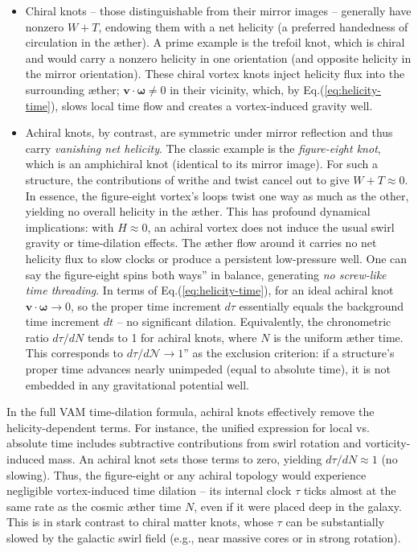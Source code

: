 \begin{itemize}
\item Chiral knots -- those distinguishable from their mirror images -- generally have nonzero $W+T$, endowing them with a net helicity (a preferred handedness of circulation in the \ae ther). A prime example is the trefoil knot, which is chiral and would carry a nonzero helicity in one orientation (and opposite helicity in the mirror orientation). These chiral vortex knots inject helicity flux into the surrounding \ae ther; $\mathbf{v}\cdot\boldsymbol{\omega}\neq 0$ in their vicinity, which, by Eq.(\ref{eq:helicity-time}), slows local time flow and creates a vortex-induced gravity well.

\item Achiral knots, by contrast, are symmetric under mirror reflection and thus carry \textit{vanishing net helicity}. The classic example is the \textit{figure-eight knot}, which is an amphichiral knot (identical to its mirror image). For such a structure, the contributions of writhe and twist cancel out to give $W+T \approx 0$. In essence, the figure-eight vortex's loops twist one way as much as the other, yielding no overall helicity in the \ae ther. This has profound dynamical implications: with $H \approx 0$, an achiral vortex does not induce the usual swirl gravity or time-dilation effects. The \ae ther flow around it carries no net helicity flux to slow clocks or produce a persistent low-pressure well. One can say the figure-eight spins both ways'' in balance, generating \textit{no screw-like time threading}. In terms of Eq.(\ref{eq:helicity-time}), for an ideal achiral knot $\mathbf{v}\cdot\boldsymbol{\omega}\to 0$, so the proper time increment $d\tau$ essentially equals the background time increment $dt$ -- no significant dilation. Equivalently, the chronometric ratio $d\tau/dN$ tends to 1 for achiral knots, where $N$ is the uniform \ae ther time. This corresponds to $d\tau/d\mathcal{N} \to 1$'' as the exclusion criterion: if a structure's proper time advances nearly unimpeded (equal to absolute time), it is not embedded in any gravitational potential well.
\end{itemize}

In the full VAM time-dilation formula, achiral knots effectively remove the helicity-dependent terms. For instance, the unified expression for local vs. absolute time includes subtractive contributions from swirl rotation and vorticity-induced mass. An achiral knot sets those terms to zero, yielding $d\tau/dN \approx 1$ (no slowing). Thus, the figure-eight or any achiral topology would experience negligible vortex-induced time dilation -- its internal clock $\tau$ ticks almost at the same rate as the cosmic \ae ther time $N$, even if it were placed deep in the galaxy. This is in stark contrast to chiral matter knots, whose $\tau$ can be substantially slowed by the galactic swirl field (e.g., near massive cores or in strong rotation).

